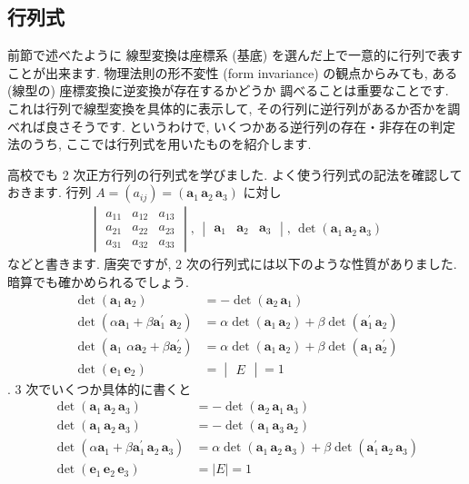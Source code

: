 \documentclass[openany, a4paper, oneside]{jsbook}
\begin{document}
\subsection{行列式}

前節で述べたように
線型変換は座標系 (基底) を選んだ上で一意的に行列で表すことが出来ます.
物理法則の形不変性 (form invariance) の観点からみても, ある (線型の) 座標変換に逆変換が存在するかどうか
調べることは重要なことです.
これは行列で線型変換を具体的に表示して, その行列に逆行列があるか否かを調べれば良さそうです.
というわけで, いくつかある逆行列の存在・非存在の判定法のうち, ここでは行列式を用いたものを紹介します.

高校でも 2 次正方行列の行列式を学びました. よく使う行列式の記法を確認しておきます.
行列 $A = (a_{ij}) = (\bm{a}_{1}\, \bm{a}_{2} \, \bm{a}_{3})$ に対し
\begin{align}
 \begin{vmatrix} a_{11} & a_{12} & a_{13} \\ a_{21} & a_{22} & a_{23} \\ a_{31} & a_{32} & a_{33} \end{vmatrix} , \,
 \begin{vmatrix} \bm{a}_{1} & \bm{a}_{2} & \bm{a}_{3} \end{vmatrix} ,\,
 \det \left ( \bm{a}_{1} \, \bm{a}_{2} \, \bm{a}_{3} \right)
\end{align}
などと書きます. 唐突ですが, 2 次の行列式には以下のような性質がありました.
暗算でも確かめられるでしょう.
\begin{align}
 \det \left ( \bm{a}_{1} \, \bm{a}_{2} \right)
 &= - \det \left ( \bm{a}_{2} \, \bm{a}_{1} \right) \\
 \det \left ( \alpha \bm{a}_{1} + \beta \bm{a}^{'}_{1}  \,\, \bm{a}_{2} \right)
 &= \alpha \det \left ( \bm{a}_{1} \, \bm{a}_{2} \right)
 +\beta \det \left (  \bm{a}^{'}_{1}  \, \bm{a}_{2} \right) \\
 \det \left ( \bm{a}_{1} \,\, \alpha \bm{a}_{2} + \beta \bm{a}^{'}_{2}  \right)
 &= \alpha \det \left ( \bm{a}_{1} \, \bm{a}_{2} \right) + \beta \det \left (  \bm{a}_{1}  \, \bm{a}^{'}_{2} \right) \\
 \det \left ( \bm{e}_{1} \, \bm{e}_{2} \right) &= \begin{vmatrix} E \end{vmatrix} = 1
\end{align}
. 3 次でいくつか具体的に書くと
\begin{align}
 \det \left ( \bm{a}_{1} \, \bm{a}_{2} \, \bm{a}_{3} \right)
 &= - \det \left ( \bm{a}_{2} \, \bm{a}_{1} \, \bm{a}_{3} \right) \\
 \det \left ( \bm{a}_{1} \, \bm{a}_{2} \, \bm{a}_{3} \right)
 &= - \det \left ( \bm{a}_{1} \, \bm{a}_{3} \, \bm{a}_{2} \right) \\
 \det \left ( \alpha \bm{a}_{1} + \beta \bm{a}^{'}_{1}  \, \bm{a}_{2}  \, \bm{a}_{3} \right)
 &=
 \alpha \det \left ( \bm{a}_{1} \, \bm{a}_{2} \, \bm{a}_{3} \right)
 +\beta \det \left (  \bm{a}^{'}_{1}  \, \bm{a}_{2} \, \bm{a}_{3} \right) \\
 \det \left ( \bm{e}_{1} \, \bm{e}_{2} \, \bm{e}_{3} \right) &= \mid E \mid = 1
\end{align}
\end{document}
